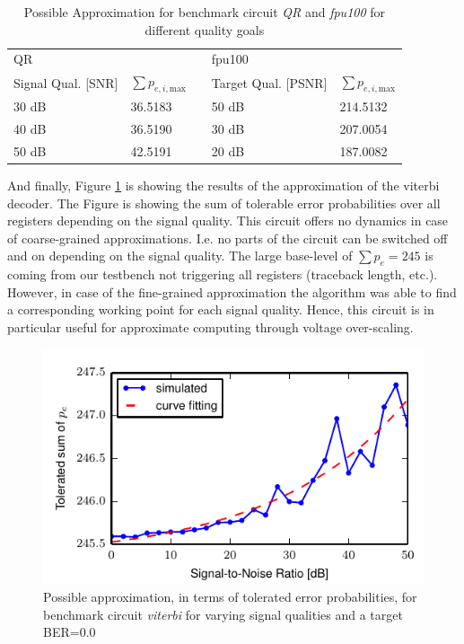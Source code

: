 \documentclass[conference]{IEEEtran}
\begin{document}
\begin{table}[htb]
\caption{Possible Approximation for benchmark circuit \emph{QR} and \emph{fpu100} for different quality goals}
\label{tab:approx}
\centering
\begin{tabular} { l  l  l  l  l }
\multicolumn{2}{l}{QR} & & \multicolumn{2}{l}{fpu100} \\
\cline{1-2} \cline{4-5}
Signal Qual. [SNR] & $\sum p_{e,i,\textrm{max}}$ & & Target Qual. [PSNR] & $\sum p_{e,i,\textrm{max}}$\\
\cline{1-2} \cline{4-5}
30 dB & 36.5183 & &50 dB & 214.5132 \\
40 dB & 36.5190 & &30 dB & 207.0054 \\
50 dB & 42.5191 & &20 dB & 187.0082 \\

\hline



\end{tabular}
\end{table}

And finally, Figure \ref{fig:power_viterbi} is showing the results of the approximation of the viterbi decoder. The Figure is showing the sum of tolerable error probabilities over all registers depending on the signal quality. This circuit offers no dynamics in case of coarse-grained approximations. I.e. no parts of the circuit can be switched off and on depending on the signal quality. The large base-level of $\sum p_e = 245$ is coming from our testbench not triggering all registers (traceback length, etc.). However, in case of the fine-grained approximation the algorithm was able to find a corresponding working point for each signal quality. Hence, this circuit is in particular useful for approximate computing through voltage over-scaling.
\begin{figure}[htb]
  \centering
  \includegraphics[width=.48\textwidth]{figs/optimization_viterbi}
  \caption{Possible approximation, in terms of tolerated error probabilities, for benchmark circuit \emph{viterbi} for varying signal qualities and a target BER=$0.0$}
  \label{fig:power_viterbi}
\end{figure}
\end{document}
